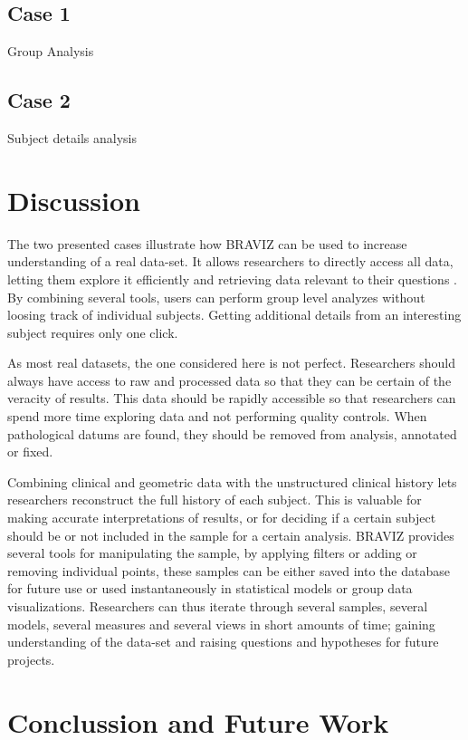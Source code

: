\documentclass[twocolumn]{svjour3}
\begin{document}
\subsection{Case 1}

Group Analysis

\subsection{Case 2}

Subject details analysis

\section{Discussion}
\label{sec:disc}

The two presented cases illustrate how BRAVIZ can be used to increase understanding of a real data-set. 
It allows researchers to directly access all data, letting them explore it efficiently and retrieving data relevant to their questions . By combining several tools, users can perform group level analyzes without loosing track of individual subjects. Getting additional details from an interesting subject requires only one click. 

As most real datasets, the one considered here is not perfect. Researchers should always have access to raw and processed data so that they can be certain of the veracity of results. This data should be rapidly accessible so that researchers can spend more time exploring data and not performing quality controls. When pathological datums are found, they should be removed from analysis, annotated or fixed. 

Combining clinical and geometric data with the unstructured clinical history lets researchers reconstruct the full history of each subject. This is valuable for making accurate interpretations of results, or for deciding if a certain subject should be or not included in the sample for a certain analysis. BRAVIZ provides several tools for manipulating the sample, by applying filters or adding or removing individual points, these samples can be either saved into the database for future use or used instantaneously in statistical models or group data visualizations. Researchers can thus iterate through several samples, several models, several measures and several views in short amounts of time; gaining understanding of the data-set and raising questions and hypotheses for future projects.

\section{Conclussion and Future Work}
\end{document}
